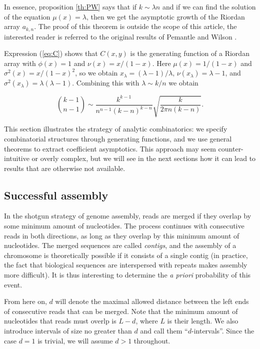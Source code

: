 \documentclass{article}
\begin{document}
In essence, proposition \ref{th:PW} says that if $k \sim \lambda n$ and if
we can find the solution of the equation $\mu(x) = \lambda$, then we get
the asymptotic growth of the Riordan array $a_{k,n}$. The proof of this
theorem is outside the scope of this article, the interested reader is
referred to the original results of Pemantle and Wilson
\cite{PemWil08,AnalComb2013}.

Expression (\ref{eq:C}) shows that $C(x,y)$ is the generating function of
a Riordan array with $\phi(x) = 1$ and $\nu(x) = x/(1-x)$.  Here $\mu(x) =
1/(1-x)$ and $\sigma^2(x) = x/(1-x)^2$, so we obtain $x_\lambda = (\lambda
-1)/\lambda$, $\nu(x_\lambda) = \lambda -1$, and $\sigma^2(x_\lambda) =
\lambda(\lambda-1)$. Combining this with $\lambda \sim k/n$ we obtain

\begin{equation}
\label{eq:assBC}
{k-1 \choose n-1} \sim \frac{k^{k-1}}{n^{n-1}(k-n)^{k-n}}
\sqrt{\frac{k}{2\pi n(k-n)}}.
\end{equation}

This section illustrates the strategy of analytic combinatorics: we
specify combinatorial structures through generating functions, and we use
general theorems to extract coefficient asymptotics. This approach may
seem counter-intuitive or overly complex, but we will see in the next
sections how it can lead to results that are otherwise not available. 

\subsection{Successful assembly}

In the shotgun strategy of genome assembly, reads are merged if they
overlap by some minimum amount of nucleotides. The process continues with
consecutive reads in both directions, as long as they overlap by this
minimum amount of nucleotides. The merged sequences are called
\emph{contigs}, and the assembly of a chromosome is theoretically possible
if it consists of a single contig (in practice, the fact that biological
sequences are interspersed with repeats makes assembly more difficult). It
is thus interesting to determine the \textit{a priori} probability of this
event.

From here on, $d$ will denote the maximal allowed distance between the
left ends of consecutive reads that can be merged. Note that the minimum
amount of nucleotides that reads must overlp is $L-d$, where $L$ is their
length. We also introduce intervals of size no greater than $d$ and call
them ``$d$-intervals''. Since the case $d=1$ is trivial, we will assume $d
> 1$ throughout.
\end{document}
